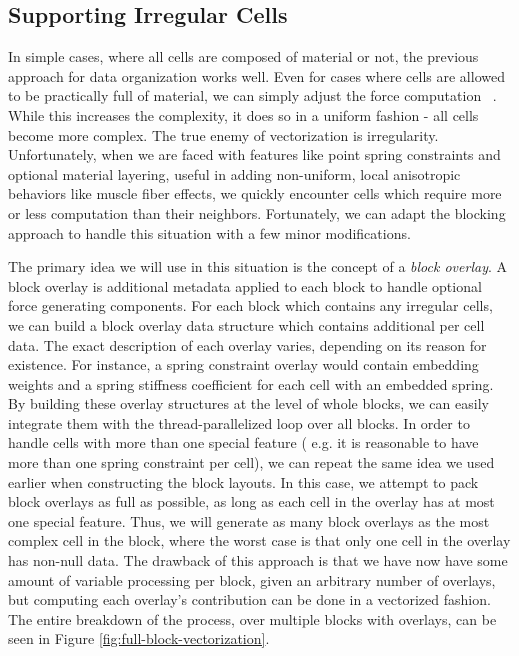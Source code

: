 \subsection{Supporting Irregular Cells}

In simple cases, where all cells are composed of material or not, the
previous approach for data organization works well. Even for cases
where cells are allowed to be practically full of material, we can
simply adjust the force computation ~\citep{PatteMS:2012}. While this
increases the complexity, it does so in a uniform fashion - all cells
become more complex. The true enemy of vectorization is
irregularity. Unfortunately, when we are faced with features like
point spring constraints and optional material layering, useful in
adding non-uniform, local anisotropic behaviors like muscle fiber
effects, we quickly encounter cells which require more or less
computation than their neighbors. Fortunately, we can adapt the
blocking approach to handle this situation with a few minor
modifications.

The primary idea we will use in this situation is the concept of a
\textit{block overlay}. A block overlay is additional metadata applied
to each block to handle optional force generating components. For each
block which contains any irregular cells, we can build a block overlay
data structure which contains additional per cell data. The exact
description of each overlay varies, depending on its reason for
existence. For instance, a spring constraint overlay would contain
embedding weights and a spring stiffness coefficient for each cell
with an embedded spring. By building these overlay structures at the
level of whole blocks, we can easily integrate them with the
thread-parallelized loop over all blocks. In order to handle cells
with more than one special feature ( e.g. it is reasonable to have
more than one spring constraint per cell), we can repeat the same idea
we used earlier when constructing the block layouts. In this case, we
attempt to pack block overlays as full as possible, as long as each
cell in the overlay has at most one special feature. Thus, we will
generate as many block overlays as the most complex cell in the block,
where the worst case is that only one cell in the overlay has non-null
data. The drawback of this approach is that we have now have some
amount of variable processing per block, given an arbitrary number of
overlays, but computing each overlay's contribution can be done in a
vectorized fashion. The entire breakdown of the process, over multiple
blocks with overlays, can be seen in Figure \ref{fig:full-block-vectorization}.

